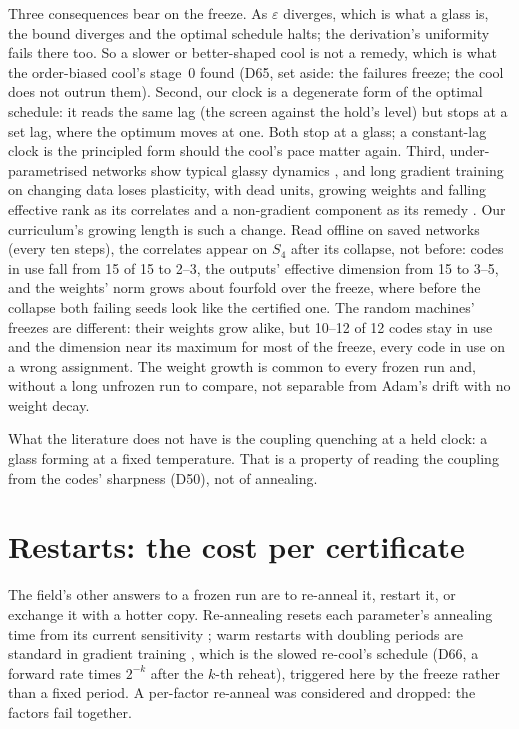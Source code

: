 \documentclass[11pt]{article}
\begin{document}
Three consequences bear on the freeze. As $\varepsilon$ diverges, which is what a glass is, the bound
diverges and the optimal schedule halts; the derivation's uniformity fails there too. So a slower
or better-shaped cool is not a remedy, which is what the order-biased cool's stage~0 found (D65,
set aside: the failures freeze; the cool does not outrun them). Second, our clock is a degenerate
form of the optimal schedule: it reads the same lag (the screen against the hold's level) but stops
at a set lag, where the optimum moves at one. Both stop at a glass; a constant-lag clock is the
principled form should the cool's pace matter again. Third, under-parametrised networks show typical
glassy dynamics \citep{baity-jesi-2018-dynamics-dnn-versus-glassy-systems}, and long gradient training
on changing data loses plasticity, with dead units, growing weights and falling effective rank as
its correlates and a non-gradient component as its remedy
\citep{dohare-2023-maintaining-plasticity-deep-continual-learning,ash-2020-warm-starting-neural-network-training}.
Our curriculum's growing length is such a change. Read offline on saved networks (every ten steps),
the correlates appear on $S_4$ after its collapse, not before: codes in use fall from 15 of 15 to 2--3,
the outputs' effective dimension from 15 to 3--5, and the weights' norm grows about fourfold over the
freeze, where before the collapse both failing seeds look like the certified one. The random machines'
freezes are different: their weights grow alike, but 10--12 of 12 codes stay in use and the dimension
near its maximum for most of the freeze, every code in use on a wrong assignment. The weight growth is
common to every frozen run and, without a long unfrozen run to compare, not separable from Adam's drift
with no weight decay.

What the literature does not have is the coupling quenching at a held clock: a glass forming at a
fixed temperature. That is a property of reading the coupling from the codes' sharpness (D50), not
of annealing.

\section{Restarts: the cost per certificate}
\label{sec:restarts}

The field's other answers to a frozen run are to re-anneal it, restart it, or exchange it with a
hotter copy. Re-annealing resets each parameter's annealing time from its current sensitivity
\citep{ingber-1989-very-fast-simulated-reannealing}; warm restarts with doubling periods are standard
in gradient training \citep{loshchilov-2017-sgdr-warm-restarts}, which is the slowed re-cool's
schedule (D66, a forward rate times $2^{-k}$ after the $k$-th reheat), triggered here by the freeze
rather than a fixed period. A per-factor re-anneal was considered and dropped: the factors fail
together.
\end{document}

